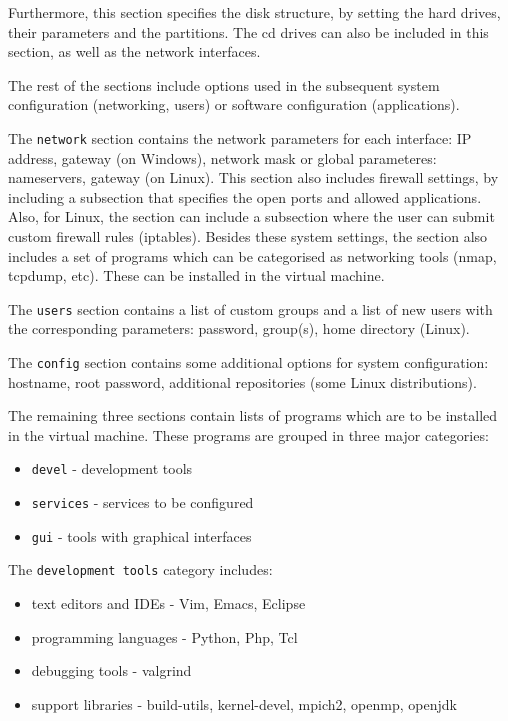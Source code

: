 Furthermore, this section specifies the disk structure, by setting the hard 
drives, their parameters and the partitions. The cd drives can also be included 
in this section, as well as the network interfaces.

The rest of the sections include options used in the subsequent system 
configuration (networking, users) or software configuration (applications).

The \texttt{network} section contains the network parameters for each 
interface: IP address, gateway (on Windows), network mask or global 
parameteres: nameservers, gateway (on Linux). This section also includes 
firewall settings, by including a subsection that specifies the open ports and 
allowed applications. Also, for Linux, the section can include a subsection 
where the user can submit custom firewall rules (iptables). Besides these 
system settings, the section also includes a set of programs which can be 
categorised as networking tools (nmap, tcpdump, etc). These can be 
installed in the virtual machine.

The \texttt{users} section contains a list of custom groups and a list of new 
users with the corresponding parameters: password, group(s), home directory 
(Linux).

The \texttt{config} section contains some additional options for system 
configuration: hostname, root password, additional repositories (some Linux 
distributions).

The remaining three sections contain lists of programs which are to be 
installed in the virtual machine. These programs are grouped in three major 
categories:
\begin{itemize}
  \item \texttt{devel} - development tools
  \item \texttt{services} - services to be configured
  \item \texttt{gui} - tools with graphical interfaces
\end{itemize}

The \texttt{development tools} category includes:
\begin{itemize}
  \item text editors and IDEs - Vim, Emacs, Eclipse
  \item programming languages - Python, Php, Tcl
  \item debugging tools - valgrind
  \item support libraries - build-utils, kernel-devel, mpich2, openmp, openjdk
\end{itemize}


